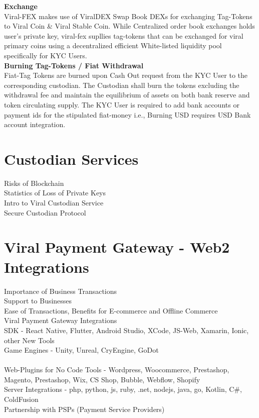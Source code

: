 \documentclass[conference]{IEEEtran}
\begin{document}
\textbf{Exchange}\\

Viral-FEX makes use of ViralDEX Swap Book DEXs for exchanging Tag-Tokens to Viral Coin \& Viral Stable Coin. While Centralized order book exchanges holds user's private key, viral-fex supllies tag-tokens that can be exchanged for viral primary coins using a decentralized efficient White-listed liquidity pool specifically for KYC Users.\\




\textbf{Burning Tag-Tokens / Fiat Withdrawal}\\

Fiat-Tag Tokens are burned upon Cash Out request from the KYC User to the corresponding custodian. The Custodian shall burn the tokens excluding the withdrawal fee and maintain the equilibrium of assets on both bank reserve and token circulating supply. The KYC User is required to add bank accounts or payment ids for the stipulated fiat-money i.e., Burning USD requires USD Bank account integration. 

\section{\textbf{Custodian Services}}

Risks of Blockchain\\
Statistics of Loss of Private Keys\\
Intro to Viral Custodian Service\\
Secure Custodian Protocol\\

\section{\textbf{Viral Payment Gateway - Web2 Integrations}}

Importance of Business Transactions\\
Support to Businesses\\
Ease of Transactions, Benefits for E-commerce and Offline Commerce\\
Viral Payment Gateway Integrations\\
SDK - React Native, Flutter, Android Studio, XCode, JS-Web, Xamarin, Ionic, other New Tools \\
Game Engines - Unity, Unreal, CryEngine, GoDot\\
\\
Web-Plugins for No Code Tools - Wordpress, Woocommerce, Prestashop, Magento, Prestashop, Wix, CS Shop, Bubble, Webflow, Shopify\\
Server Integrations - php, python, js, ruby, .net, nodejs, java, go, Kotlin, C\#, ColdFusion\\
Partnership with PSPs (Payment Service Providers)\\
\end{document}
